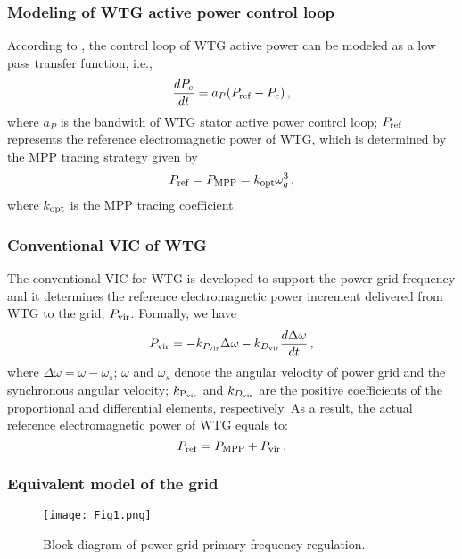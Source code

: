 \documentclass[journal]{IEEEtran}
\begin{document}
\subsubsection{Modeling of WTG active power control loop}
According to \cite{Rahimi2018Improvement}, the control loop of WTG active power can be modeled as a low pass transfer function, i.e.,
%
\begin{equation}
  \frac{d P_e}{dt} = a_P (P_{\rm ref} - P_e) \, ,
  \label{Eq.11}
\end{equation}
where $a_P$ is the bandwith of WTG stator active power control loop; $P_{\rm ref}$ represents the reference electromagnetic power of WTG, which is determined by the MPP tracing strategy \cite{Chen2017} given by
\begin{equation}
  P_{\rm ref} = P_{\rm MPP} = k_{\rm opt} \omega_g^3 \, ,
  \label{Eq.12}
\end{equation}
where $k_{\rm opt}$ is the MPP tracing coefficient.  

\subsubsection{Conventional VIC of WTG}
The conventional VIC for WTG is developed to support the power grid frequency and it determines the reference electromagnetic power increment delivered from WTG to the grid, $P_{\rm vir}$. Formally, we have
%
\begin{equation}
  P_{\rm vir} = - k_{P_{\rm vir}}\Delta \omega -
  k_{D_{\rm vir}}\frac{d\Delta \omega}{dt} \, ,
  \label{Eq.13}
\end{equation}
where  $\Delta \omega = \omega-\omega_s$; $\omega$ and $\omega_s$ denote the angular
velocity of power grid and the synchronous angular velocity; $k_{\rm P_{\rm vir}}$ and $k_{D_{\rm vir}}$ are the positive coefficients of the proportional and differential elements, respectively. As a result, the actual reference electromagnetic power of WTG equals to:
%
\begin{equation}
  P_{\rm ref} = P_{\rm MPP} + P_{\rm vir} \, .
  \label{Eq.14}
\end{equation}

\subsubsection{Equivalent model of the grid}

\begin{figure}
  \centering
  \texttt{[image: Fig1.png]}
  \caption{Block diagram of power grid primary frequency regulation.}
  \label{Fig.1}
\end{figure}
\end{document}
